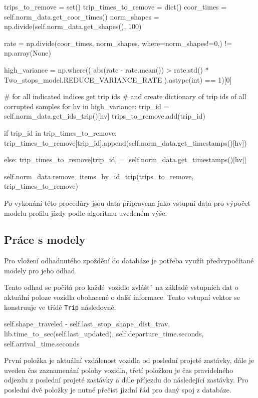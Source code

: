 \begin{code}[frame=none]
trips_to_remove = set()
trip_times_to_remove = dict()
coor_times = self.norm_data.get_coor_times()
norm_shapes = np.divide(self.norm_data.get_shapes(), 100)

rate = np.divide(coor_times, norm_shapes, where=norm_shapes!=0,) != np.array(None)

high_variance = np.where((
    abs(rate - rate.mean()) > rate.std() * Two_stops_model.REDUCE_VARIANCE_RATE
  ).astype(int) == 1)[0]

# for all indicated indices get trip ids
# and create dictionary of trip ids of all corrupted samples
for hv in high_variance:
  trip_id = self.norm_data.get_ids_trip()[hv]
  trips_to_remove.add(trip_id)

  if trip_id in trip_times_to_remove:
    trip_times_to_remove[trip_id].append(self.norm_data.get_timestamps()[hv])

  else:
    trip_times_to_remove[trip_id] = [self.norm_data.get_timestamps()[hv]]

self.norm_data.remove_items_by_id_trip(trips_to_remove, trip_times_to_remove)
\end{code}

Po vykonání této procedůry jsou data připravena jako vstupní data pro výpočet modelu profilu jízdy podle algoritmu uvedeném výše.

\subsection{Práce s modely}

Pro vložení odhadnutého zpoždění do databáze je potřeba využít předvypočítané modely pro jeho odhad.

Tento odhad se počítá pro každé vozidlo zvláštˇ na základě vstupních dat o aktuální poloze vozidla obohacené o další informace. Tento vstupní vektor se konstruuje ve třídě \verb-Trip- následovně.

\begin{code}[frame=none]
self.shape_traveled - self.last_stop_shape_dist_trav,
lib.time_to_sec(self.last_updated),
self.departure_time.seconds,
self.arrival_time.seconds
\end{code}

První položka je aktuální vzdálenost vozidla od poslední projeté zastávky, dále je uveden čas zaznamenání polohy vozidla, třetí položkou je čas pravidelného odjezdu z poslední projeté zastávky a dále příjezdu do následející zastávky. Pro poslední dvě položky je nutné přečíst jízdní řád pro daný spoj z databáze.

